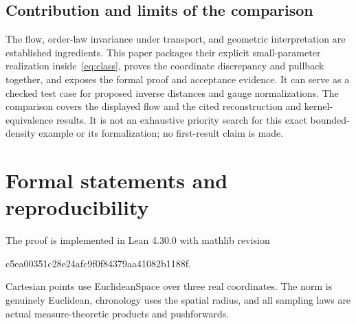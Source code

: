 \documentclass[11pt]{article}
\theoremstyle{remark}
\newcommand{\code}[1]{{\small\ttfamily\def\_{\textunderscore\allowbreak}#1}}
\begin{document}
\subsection{Contribution and limits of the comparison}
The flow, order-law invariance under transport, and geometric
interpretation are established ingredients. This paper packages their
explicit small-parameter realization inside~\eqref{eq:class}, proves
the coordinate discrepancy and pullback together, and exposes the
formal proof and acceptance evidence. It can serve as a checked test
case for proposed inverse distances and gauge normalizations.
The comparison covers the displayed flow and the cited reconstruction
and kernel-equivalence results. It is not an exhaustive priority search
for this exact bounded-density example or its formalization; no first-result
claim is made.

\section{Formal statements and reproducibility}\label{sec:formal}
The proof is implemented in Lean 4.30.0 with mathlib revision
\begin{center}
\code{c5ea00351c28e24afc9f0f84379aa41082b1188f}.
\end{center}
Cartesian points use
\code{EuclideanSpace} over three real coordinates. The norm is genuinely
Euclidean, chronology uses the spatial radius, and all sampling laws
are actual measure-theoretic products and pushforwards.
\end{document}

